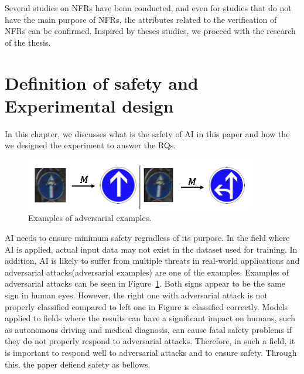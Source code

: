 \documentclass[journal,article,submit,moreauthors,pdftex]{Definitions/mdpi}
\begin{document}
Several studies on NFRs have benn conducted, and even for studies that do not have the main purpose of NFRs, the attributes related to the verification of NFRs can be confirmed.
Inspired by theses studies, we proceed with the research of the thesis.

\section{Definition of safety and Experimental design} %


In this chapter, we discusses what is the safety of AI in this paper and how the we designed the experiment to answer the RQs.

\begin{figure}[H]
\includegraphics[width=13 cm]{Definitions/example-of-adversarial.png}
\caption{Examples of adversarial examples.\label{example-of-adversarial}}
\end{figure}   

AI needs to ensure minimum safety regradless of its purpose. In the field where AI is applied, actual input data may not exist in the dataset used for training.
In addition, AI is likely to suffer from multiple threats in real-world applications and adversarial attacks(adversarial examples) are one of the examples.
Examples of adversarial attacks can be seen in Figure~\ref{example-of-adversarial}. Both signs appear to be the same sign in human eyes. However, the right one with adversarial attack is not properly classified compared to left one in Figure is classified correctly.
Models applied to fields where the results can have a significant impact on humans, such as autonomous driving and medical diagnosis, can cause fatal safety problems if they do not properly respond to adversarial attacks. Therefore, in such a field, it is important to respond well to adversarial attacks and to ensure safety.
Through this, the paper defiend safety as bellows.
\end{document}
